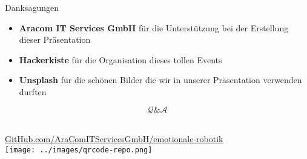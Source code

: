 \documentclass[aspectratio=169]{beamer}
\begin{document}
\begin{frame}{Danksagungen}
  \begin{itemize}
    \item \textbf{Aracom IT Services GmbH} für die Unterstützung bei der Erstellung dieser Präsentation
    \item \textbf{Hackerkiste} für die Organisation dieses tollen Events
    \item \textbf{Unsplash} für die schönen Bilder die wir in unserer Präsentation verwenden durften
  \end{itemize}
\end{frame}

\begin{frame}[c]{}
  \centering
  \begin{minipage}{\textwidth}
    \centering
    \Huge \[\mathcal Q \& \mathcal A\]
    \Large {}
  \end{minipage}
\end{frame}

\begin{frame}[c]{}
  \centering
  \begin{minipage}{\textwidth}
    \centering
    \Large {}\\
    \href{https://github.com/AraComITServicesGmbH/emotionale-robotik}{GitHub.com/AraComITServicesGmbH/emotionale-robotik}\\
    \vspace{.4cm}
    \texttt{[image: ../images/qrcode-repo.png]}
  \end{minipage}
\end{frame}
\end{document}
